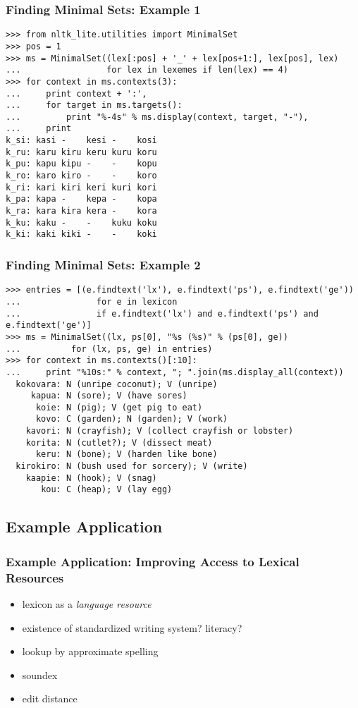 \documentclass{beamer}             %
\begin{document}
\begin{frame}[fragile]
\frametitle{Finding Minimal Sets: Example 1}
\scriptsize

\begin{verbatim}
>>> from nltk_lite.utilities import MinimalSet
>>> pos = 1
>>> ms = MinimalSet((lex[:pos] + '_' + lex[pos+1:], lex[pos], lex)
...                 for lex in lexemes if len(lex) == 4)
>>> for context in ms.contexts(3):
...     print context + ':',
...     for target in ms.targets():
...         print "%-4s" % ms.display(context, target, "-"),
...     print
k_si: kasi -    kesi -    kosi
k_ru: karu kiru keru kuru koru
k_pu: kapu kipu -    -    kopu
k_ro: karo kiro -    -    koro
k_ri: kari kiri keri kuri kori
k_pa: kapa -    kepa -    kopa
k_ra: kara kira kera -    kora
k_ku: kaku -    -    kuku koku
k_ki: kaki kiki -    -    koki
\end{verbatim}
\end{frame}

\begin{frame}[fragile]
\frametitle{Finding Minimal Sets: Example 2}
\scriptsize

\begin{verbatim}
>>> entries = [(e.findtext('lx'), e.findtext('ps'), e.findtext('ge'))
...               for e in lexicon
...               if e.findtext('lx') and e.findtext('ps') and e.findtext('ge')]
>>> ms = MinimalSet((lx, ps[0], "%s (%s)" % (ps[0], ge))
...          for (lx, ps, ge) in entries)
>>> for context in ms.contexts()[:10]:
...     print "%10s:" % context, "; ".join(ms.display_all(context))
  kokovara: N (unripe coconut); V (unripe)
     kapua: N (sore); V (have sores)
      koie: N (pig); V (get pig to eat)
      kovo: C (garden); N (garden); V (work)
    kavori: N (crayfish); V (collect crayfish or lobster)
    korita: N (cutlet?); V (dissect meat)
      keru: N (bone); V (harden like bone)
  kirokiro: N (bush used for sorcery); V (write)
    kaapie: N (hook); V (snag)
       kou: C (heap); V (lay egg)
\end{verbatim}
\end{frame}

\subsection{Example Application}

\begin{frame}
\frametitle{Example Application: Improving Access to Lexical Resources}
\begin{itemize}
\item lexicon as a \textit{language resource}
\item existence of standardized writing system?  literacy?
\item lookup by approximate spelling
\item soundex
\item edit distance
\end{itemize}
\end{frame}
\end{document}
